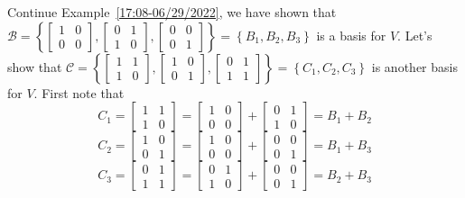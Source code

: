 \documentclass{beamer}
\theoremstyle{definition}
\theoremstyle{remark}
\begin{document}
\begin{frame}[t]
\begin{example}
Continue Example~\ref{17:08-06/29/2022}, we have shown that $\mathcal B=\left\{\begin{bmatrix}
1&0\\0&0
\end{bmatrix},\begin{bmatrix}
0&1\\1&0
\end{bmatrix},\begin{bmatrix}
0&0\\0&1
\end{bmatrix}\right\}=\left\{B_1,B_2,B_3\right\}$ is a basis for $V$\pause. Let's show that $\mathcal C=\left\{\begin{bmatrix}
1&1\\1&0
\end{bmatrix},\begin{bmatrix}
1&0\\0&1
\end{bmatrix},\begin{bmatrix}
0&1\\1&1
\end{bmatrix}\right\}=\left\{C_1,C_2,C_3\right\}$ is another basis for $V$\pause. First note that
\[
C_1=\begin{bmatrix}
1&1\\1&0
\end{bmatrix}=\begin{bmatrix}
1&0\\0&0
\end{bmatrix}+\begin{bmatrix}
0&1\\1&0
\end{bmatrix}=B_1+B_2
\]
\[
C_2=\begin{bmatrix}
1&0\\0&1
\end{bmatrix}=\begin{bmatrix}
1&0\\0&0
\end{bmatrix}+\begin{bmatrix}
0&0\\0&1
\end{bmatrix}=B_1+B_3
\]
\[
C_3=\begin{bmatrix}
0&1\\1&1
\end{bmatrix}=\begin{bmatrix}
0&1\\1&0
\end{bmatrix}+\begin{bmatrix}
0&0\\0&1
\end{bmatrix}=B_2+B_3
\]
\end{example}
\end{frame}
\end{document}
